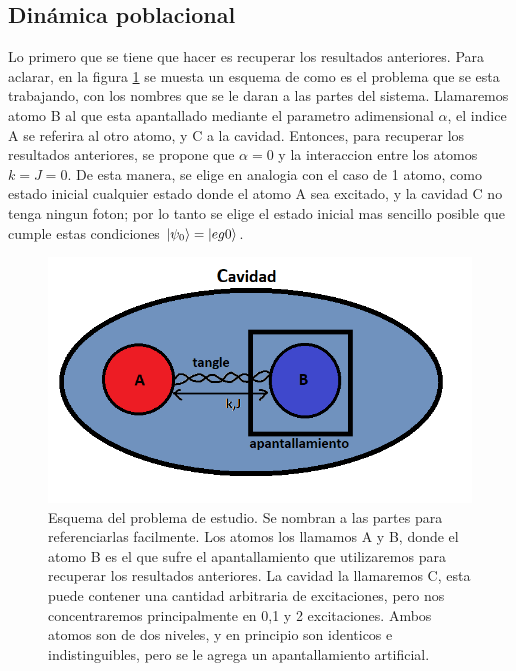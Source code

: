 \subsection{Dinámica poblacional}

Lo primero que se tiene que hacer es recuperar los resultados anteriores. Para aclarar, en la figura \ref{fig4:diagrama esquematico} se muesta un esquema de como es el problema que se esta trabajando, con los nombres que se le daran a las partes del sistema. Llamaremos atomo B al que esta apantallado mediante el parametro adimensional $\alpha$, el indice A se referira al otro atomo, y C a la cavidad. Entonces, para recuperar los resultados anteriores, se propone que $\alpha=0$ y la interaccion entre los atomos $k=J=0$. De esta manera, se elige en analogia con el caso de 1 atomo, como estado inicial cualquier estado donde el atomo A sea excitado, y la cavidad C no tenga ningun foton; por lo tanto se elige el estado inicial mas sencillo posible que cumple estas condiciones $\ket{\psi_0}=\ket{eg0}$.
\begin{figure}[H]
    \begin{minipage}[c]{0.67\textwidth}
        \includegraphics[width=\textwidth]{figuras/ch4/diagrama esquematico.png}
    \end{minipage}\hfill
    \begin{minipage}[c]{0.3\textwidth}
    \caption{Esquema del problema de estudio. Se nombran a las partes para referenciarlas facilmente. Los atomos los llamamos A y B, donde el atomo B es el que sufre el apantallamiento que utilizaremos para recuperar los resultados anteriores. La cavidad la llamaremos C, esta puede contener una cantidad arbitraria de excitaciones, pero nos concentraremos principalmente en 0,1 y 2 excitaciones. Ambos atomos son de dos niveles, y en principio son identicos e indistinguibles, pero se le agrega un apantallamiento artificial.
         } \label{fig4:diagrama esquematico}
  \end{minipage}
\end{figure}
